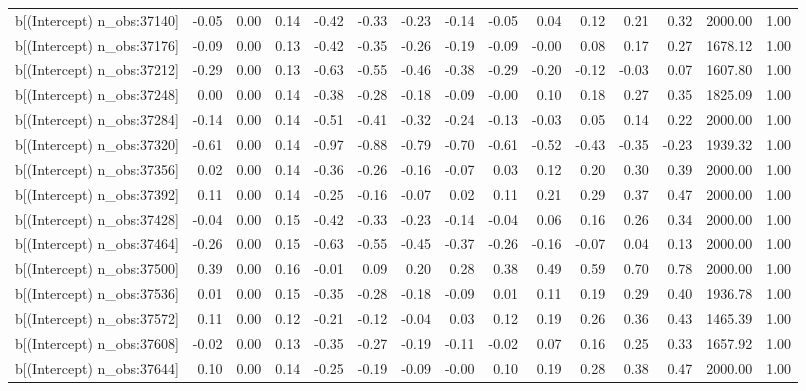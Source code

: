 \begin{table}[ht]
\begin{tabular}{rrrrrrrrrrrrrrr}
  b[(Intercept) n\_obs:37140] & -0.05 & 0.00 & 0.14 & -0.42 & -0.33 & -0.23 & -0.14 & -0.05 & 0.04 & 0.12 & 0.21 & 0.32 & 2000.00 & 1.00 \\ 
  b[(Intercept) n\_obs:37176] & -0.09 & 0.00 & 0.13 & -0.42 & -0.35 & -0.26 & -0.19 & -0.09 & -0.00 & 0.08 & 0.17 & 0.27 & 1678.12 & 1.00 \\ 
  b[(Intercept) n\_obs:37212] & -0.29 & 0.00 & 0.13 & -0.63 & -0.55 & -0.46 & -0.38 & -0.29 & -0.20 & -0.12 & -0.03 & 0.07 & 1607.80 & 1.00 \\ 
  b[(Intercept) n\_obs:37248] & 0.00 & 0.00 & 0.14 & -0.38 & -0.28 & -0.18 & -0.09 & -0.00 & 0.10 & 0.18 & 0.27 & 0.35 & 1825.09 & 1.00 \\ 
  b[(Intercept) n\_obs:37284] & -0.14 & 0.00 & 0.14 & -0.51 & -0.41 & -0.32 & -0.24 & -0.13 & -0.03 & 0.05 & 0.14 & 0.22 & 2000.00 & 1.00 \\ 
  b[(Intercept) n\_obs:37320] & -0.61 & 0.00 & 0.14 & -0.97 & -0.88 & -0.79 & -0.70 & -0.61 & -0.52 & -0.43 & -0.35 & -0.23 & 1939.32 & 1.00 \\ 
  b[(Intercept) n\_obs:37356] & 0.02 & 0.00 & 0.14 & -0.36 & -0.26 & -0.16 & -0.07 & 0.03 & 0.12 & 0.20 & 0.30 & 0.39 & 2000.00 & 1.00 \\ 
  b[(Intercept) n\_obs:37392] & 0.11 & 0.00 & 0.14 & -0.25 & -0.16 & -0.07 & 0.02 & 0.11 & 0.21 & 0.29 & 0.37 & 0.47 & 2000.00 & 1.00 \\ 
  b[(Intercept) n\_obs:37428] & -0.04 & 0.00 & 0.15 & -0.42 & -0.33 & -0.23 & -0.14 & -0.04 & 0.06 & 0.16 & 0.26 & 0.34 & 2000.00 & 1.00 \\ 
  b[(Intercept) n\_obs:37464] & -0.26 & 0.00 & 0.15 & -0.63 & -0.55 & -0.45 & -0.37 & -0.26 & -0.16 & -0.07 & 0.04 & 0.13 & 2000.00 & 1.00 \\ 
  b[(Intercept) n\_obs:37500] & 0.39 & 0.00 & 0.16 & -0.01 & 0.09 & 0.20 & 0.28 & 0.38 & 0.49 & 0.59 & 0.70 & 0.78 & 2000.00 & 1.00 \\ 
  b[(Intercept) n\_obs:37536] & 0.01 & 0.00 & 0.15 & -0.35 & -0.28 & -0.18 & -0.09 & 0.01 & 0.11 & 0.19 & 0.29 & 0.40 & 1936.78 & 1.00 \\ 
  b[(Intercept) n\_obs:37572] & 0.11 & 0.00 & 0.12 & -0.21 & -0.12 & -0.04 & 0.03 & 0.12 & 0.19 & 0.26 & 0.36 & 0.43 & 1465.39 & 1.00 \\ 
  b[(Intercept) n\_obs:37608] & -0.02 & 0.00 & 0.13 & -0.35 & -0.27 & -0.19 & -0.11 & -0.02 & 0.07 & 0.16 & 0.25 & 0.33 & 1657.92 & 1.00 \\ 
  b[(Intercept) n\_obs:37644] & 0.10 & 0.00 & 0.14 & -0.25 & -0.19 & -0.09 & -0.00 & 0.10 & 0.19 & 0.28 & 0.38 & 0.47 & 2000.00 & 1.00 \\ 

\end{tabular}
\end{table}
